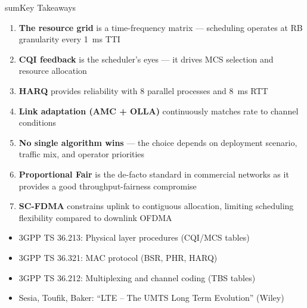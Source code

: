
\begin{CNbox}[unbreakable]{sum}{Key Takeaways}

\begin{enumerate}
\def\labelenumi{\arabic{enumi}.}
\tightlist
\item
  \textbf{The resource grid} is a time-frequency matrix — scheduling operates at RB granularity every 1~ms TTI
\item
  \textbf{CQI feedback} is the scheduler’s eyes — it drives MCS selection and resource allocation
\item
  \textbf{HARQ} provides reliability with 8 parallel processes and 8~ms RTT
\item
  \textbf{Link adaptation (AMC + OLLA)} continuously matches rate to channel conditions
\item
  \textbf{No single algorithm wins} — the choice depends on deployment scenario, traffic mix, and operator priorities
\item
  \textbf{Proportional Fair} is the de-facto standard in commercial networks as it provides a good throughput-fairness compromise
\item
  \textbf{SC-FDMA} constrains uplink to contiguous allocation, limiting scheduling flexibility compared to downlink OFDMA
\end{enumerate}

\end{CNbox}


\begin{itemize}
\tightlist
\item
  3GPP TS 36.213: Physical layer procedures (CQI/\allowbreak{}MCS tables)
\item
  3GPP TS 36.321: MAC protocol (BSR, PHR, HARQ)
\item
  3GPP TS 36.212: Multiplexing and channel coding (TBS tables)
\item
  Sesia, Toufik, Baker: ``LTE – The UMTS Long Term Evolution'' (Wiley)
\end{itemize}
